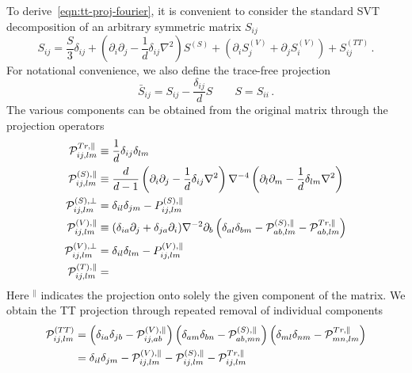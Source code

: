 \documentclass{revtex4}
\begin{document}
To derive~\eqref{eqn:tt-proj-fourier}, it is convenient to consider the standard SVT decomposition of an arbitrary symmetric matrix $S_{ij}$
\begin{equation}
  S_{ij} = \frac{S}{3}\delta_{ij} + \left(\partial_i\partial_j - \frac{1}{d}\delta_{ij}\nabla^2\right)S^{(S)} + (\partial_iS_j^{(V)} + \partial_jS^{(V)}_i) + S_{ij}^{(TT)} \, .
\end{equation}
For notational convenience, we also define the trace-free projection
\begin{equation}
  \bar{S}_{ij} = S_{ij} - \frac{\delta_{ij}}{d}S \qquad S = S_{ii} \, .
\end{equation}
The various components can be obtained from the original matrix through the projection operators
\begin{subequations}
\begin{align}
  \mathcal{P}^{Tr,\parallel}_{ij,lm} &\equiv \frac{1}{d}\delta_{ij}\delta_{lm} \\
  \mathcal{P}^{(S),\parallel}_{ij,lm} &\equiv \frac{d}{d-1}\left(\partial_i\partial_j - \frac{1}{d}\delta_{ij}\nabla^2\right)\nabla^{-4}\left(\partial_l\partial_m - \frac{1}{d}\delta_{lm}\nabla^2\right) \\
  \mathcal{P}^{(S),\perp}_{ij,lm} &= \delta_{il}\delta_{jm} - P^{(S),\parallel}_{ij,lm} \\
  \mathcal{P}^{(V),\parallel}_{ij,lm} &\equiv (\delta_{ia}\partial_j + \delta_{ja}\partial_i)\nabla^{-2}\partial_b\left(\delta_{al}\delta_{bm} - \mathcal{P}^{(S),\parallel}_{ab,lm} - \mathcal{P}^{Tr,\parallel}_{ab,lm}\right) \\
  \mathcal{P}^{(V),\perp}_{ij,lm} &= \delta_{il}\delta_{lm} - P_{ij,lm}^{(V),\parallel} \\
  \mathcal{P}^{(T),\parallel}_{ij,lm} &= \\
\end{align}
\end{subequations}
Here ${}^\parallel$ indicates the projection onto solely the given component of the matrix.
We obtain the TT projection through repeated removal of individual components
\begin{align}
  \mathcal{P}_{ij,lm}^{(TT)} &= \left(\delta_{ia}\delta_{jb} - \mathcal{P}^{(V),\parallel}_{ij,ab}\right)\left(\delta_{am}\delta_{bn}-\mathcal{P}_{ab,mn}^{(S),\parallel}\right)\left(\delta_{ml}\delta_{nm}-\mathcal{P}_{mn,lm}^{Tr,\parallel}\right) \\
  &=  \delta_{il}\delta_{jm} - \mathcal{P}_{ij,lm}^{(V),\parallel} - \mathcal{P}_{ij,lm}^{(S),\parallel} - \mathcal{P}_{ij,lm}^{Tr,\parallel}
\end{align}
\end{document}
